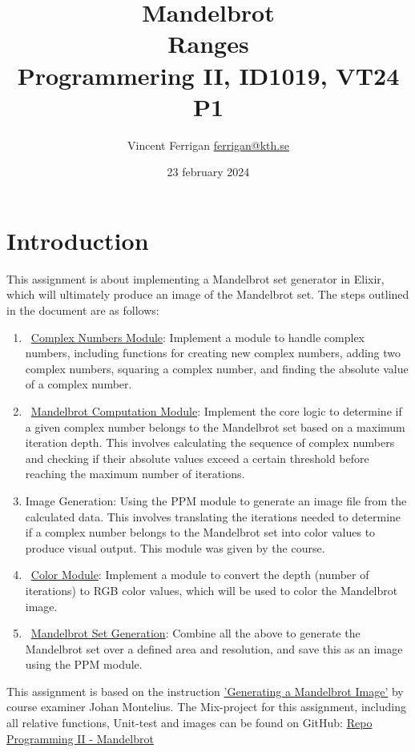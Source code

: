 \documentclass[a4paper,11pt]{article}
\begin{document}
\title{
    Mandelbrot
    \\Ranges
\\\small{Programmering II, ID1019, VT24 P1}
}
\author{Vincent Ferrigan \href{mailto:ferrigan@kth.se}{ferrigan@kth.se}}

\date{23 february 2024}
\maketitle

\section*{Introduction}
\label{sec:introduction}
This assignment is about implementing a Mandelbrot set generator in
Elixir, which will ultimately produce an image of the Mandelbrot set. 
The steps outlined in the document are as follows:
\begin{enumerate}
    \item~\hyperref[subsec:cmplx]{Complex Numbers Module}: Implement a module to handle complex numbers,
    including functions for creating new complex numbers, adding two complex
    numbers, squaring a complex number, and finding the absolute value of a
    complex number.
    \item~\hyperref[subsec:brot]{Mandelbrot Computation Module}: Implement the core logic to determine
    if a given complex number belongs to the Mandelbrot set based on a maximum
    iteration depth.
    This involves calculating the sequence of complex numbers
    and checking if their absolute values exceed a certain threshold before
    reaching the maximum number of iterations.
    \item Image Generation: Using the PPM module to generate an image file from
    the calculated data.
    This involves translating the iterations needed to
    determine if a complex number belongs to the Mandelbrot set into color
    values to produce visual output.
    This module was given by the course.
    \item~\hyperref[subsec:color]{Color Module}: Implement a module to convert the depth (number of
    iterations) to RGB color values, which will be used to color the Mandelbrot
    image.
    \item ~\hyperref[subsec:generator]{Mandelbrot Set Generation}: Combine all the above to generate the
    Mandelbrot set over a defined area and resolution, and save this as an image
    using the PPM module.
\end{enumerate}
This assignment is based on the instruction
\href{https://people.kth.se/~johanmon/courses/id1019/seminars/mandel/mandel.pdf}{'Generating a Mandelbrot Image'}
by course examiner Johan Montelius.
The Mix-project for this assignment, including all relative functions, Unit-test and images can be found on GitHub:
\href{https://github.com/VincentFerrigan/kth-id1019-programming-ii/tree/main/tasks/7/mandelbrot}{Repo Programming II - Mandelbrot}%
\end{document}
